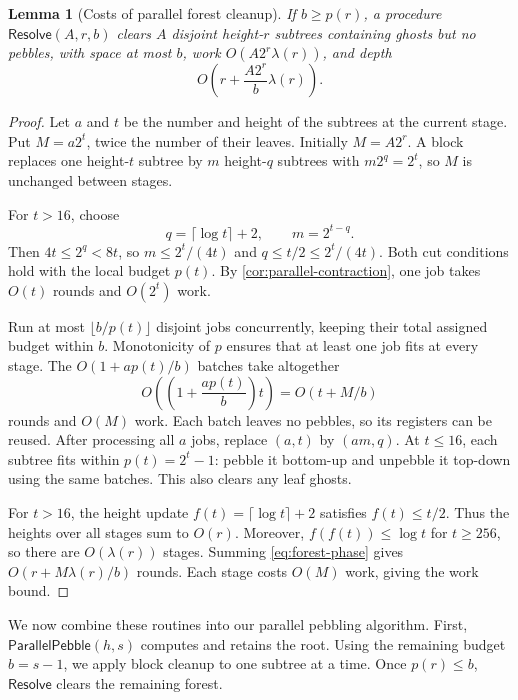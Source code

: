 \documentclass[11pt]{article}
\newtheorem{lemma}[lemma]{Lemma}
\theoremstyle{definition}
\theoremstyle{remark}
\newcommand{\Sweep}{\mathsf{ParallelPebble}}
\newcommand{\Resolve}{\mathsf{Resolve}}
\begin{document}
\begin{lemma}[Costs of parallel forest cleanup]
\label{lem:resolver}
If $b\ge p(r)$, a procedure $\Resolve(A,r,b)$ clears $A$ disjoint height-$r$ subtrees containing ghosts but no pebbles, with space at most $b$, work $O(A2^r\lambda(r))$, and depth
\begin{equation}
O\!\left(r+\frac{A2^r}{b}\lambda(r)\right).
\label{eq:forest-cleanup}
\end{equation}
\end{lemma}
\begin{proof}
Let $a$ and $t$ be the number and height of the subtrees at the current stage. Put $M=a2^t$, twice the number of their leaves. Initially $M=A2^r$. A block replaces one height-$t$ subtree by $m$ height-$q$ subtrees with $m2^q=2^t$, so $M$ is unchanged between stages.

For $t>16$, choose
\begin{equation}
q=\lceil\log t\rceil+2, \qquad m=2^{t-q}.
\label{eq:resolver-cut}
\end{equation}
Then $4t\le2^q<8t$, so $m\le2^t/(4t)$ and $q\le t/2\le2^t/(4t)$. Both cut conditions hold with the local budget $p(t)$. By \cref{cor:parallel-contraction}, one job takes $O(t)$ rounds and $O(2^t)$ work.

Run at most $\lfloor b/p(t)\rfloor$ disjoint jobs concurrently, keeping their total assigned budget within $b$. Monotonicity of $p$ ensures that at least one job fits at every stage. The $O(1+ap(t)/b)$ batches take altogether
\begin{equation}
O\!\left(\left(1+\frac{ap(t)}b\right)t\right)=O(t+M/b)
\label{eq:forest-phase}
\end{equation}
rounds and $O(M)$ work. Each batch leaves no pebbles, so its registers can be reused. After processing all $a$ jobs, replace $(a,t)$ by $(am,q)$. At $t\le16$, each subtree fits within $p(t)=2^t-1$: pebble it bottom-up and unpebble it top-down using the same batches. This also clears any leaf ghosts.

For $t>16$, the height update $f(t)=\lceil\log t\rceil+2$ satisfies $f(t)\le t/2$. Thus the heights over all stages sum to $O(r)$. Moreover, $f(f(t))\le\log t$ for $t\ge256$, so there are $O(\lambda(r))$ stages. Summing \cref{eq:forest-phase} gives $O(r+M\lambda(r)/b)$ rounds. Each stage costs $O(M)$ work, giving the work bound.
\end{proof}

We now combine these routines into our parallel pebbling algorithm. First, $\Sweep(h,s)$ computes and retains the root. Using the remaining budget $b=s-1$, we apply block cleanup to one subtree at a time. Once $p(r)\le b$, $\Resolve$ clears the remaining forest.
\end{document}
